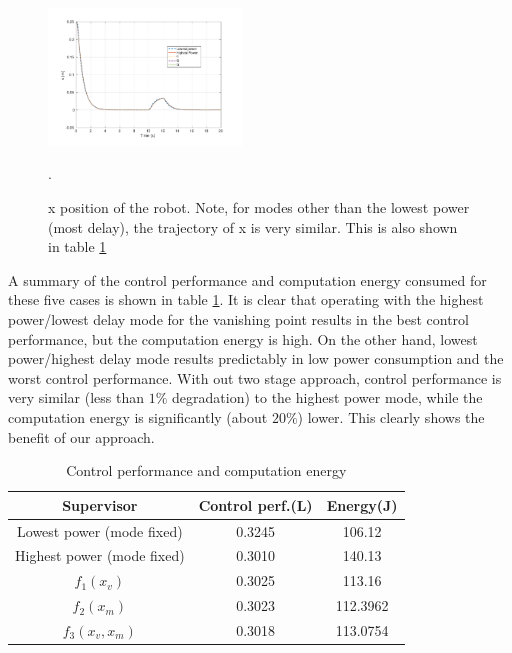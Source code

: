 \begin{figure}[hbtp]
\centering
\includegraphics[width=0.46\textwidth]{../simulations/figs/xvst.pdf}
\caption{x position of the robot. Note, for modes other than the lowest power (most delay), the trajectory of x is very similar. This is also shown in table \ref{tbl:performance}}.
\label{fig:xvst} 
\end{figure}

A summary of the control performance and computation energy consumed for these five cases is shown in table \ref{tbl:performance}. It is clear that operating with the highest power/lowest delay mode for the vanishing point results in the best control performance, but the computation energy is high. On the other hand, lowest power/highest delay mode results predictably in low power consumption and the worst control performance. With out two stage approach, control performance is very similar (less than $1\%$ degradation) to the highest power mode, while the computation energy is significantly (about $20\%$) lower. This clearly shows the benefit of our approach.

\begin{table}[htb]
\begin{center}
\caption{Control performance and computation energy}
\label{tbl:performance}
\begin{tabular} {|c|c|c|}
	\hline
	\textbf{Supervisor} & \textbf{Control perf.}(L) & \textbf{Energy}(J) \\ \hline
	Lowest power (mode fixed) & 0.3245 & 106.12  \\ \hline
	Highest power (mode fixed) & 0.3010 & 140.13  \\ \hline
	 $f_1(x_v)$ & 0.3025 & 113.16  \\ \hline
	 $f_2(x_m)$ & 0.3023 & 112.3962 \\ \hline
	 $f_3(x_v,x_m)$ & 0.3018 & 113.0754 \\ \hline
	 
\end{tabular}
	\vspace{-10pt}	
	\end{center}
\end{table}


